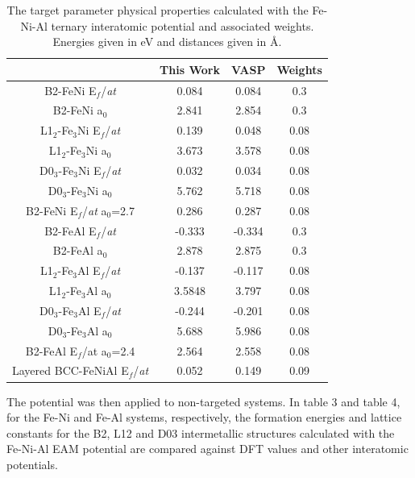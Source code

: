 \documentclass[review]{elsarticle}
\begin{document}
\begin{table}[htbp]
\caption{The target parameter physical properties calculated with the Fe-Ni-Al ternary interatomic potential and associated weights.  Energies given in eV and distances given in \AA{}.}
\begin{center}
\begin{tabular}{|c|c|c|c|}
	\hline
	& This Work & VASP & Weights \\
	 \hline
	 B2-FeNi E$_{f}$/\textit{at} & 0.084 & 0.084 & 0.3 \\
	 B2-FeNi a$_{0}$ & 2.841 & 2.854 & 0.3 \\
	 L1$_{2}$-Fe$_{3}$Ni E$_{f}$/\textit{at} & 0.139 & 0.048 & 0.08 \\
	 L1$_{2}$-Fe$_{3}$Ni a$_{0}$ & 3.673 & 3.578 & 0.08 \\
	 D0$_{3}$-Fe$_{3}$Ni E$_{f}$/\textit{at} & 0.032 & 0.034 & 0.08 \\
	 D0$_{3}$-Fe$_{3}$Ni a$_{0}$ & 5.762 & 5.718 & 0.08  \\
	 B2-FeNi E$_{f}$/\textit{at} a$_{0}$=2.7& 0.286 & 0.287 & 0.08 \\
	 B2-FeAl E$_{f}$/\textit{at} & -0.333 & -0.334 & 0.3  \\
	 B2-FeAl a$_{0}$ & 2.878 & 2.875 & 0.3 \\
	 L1$_{2}$-Fe$_{3}$Al E$_{f}$/\textit{at} & -0.137 & -0.117 & 0.08 \\
	 L1$_{2}$-Fe$_{3}$Al a$_{0}$ & 3.5848 & 3.797 & 0.08 \\
	 D0$_{3}$-Fe$_{3}$Al E$_{f}$/\textit{at} & -0.244 & -0.201 & 0.08 \\
	 D0$_{3}$-Fe$_{3}$Al a$_{0}$ & 5.688 & 5.986 & 0.08  \\
	 B2-FeAl E$_{f}$/at a$_{0}$=2.4 & 2.564 & 2.558 & 0.08  \\
	 Layered BCC-FeNiAl E$_{f}$/\textit{at}& 0.052 & 0.149 & 0.09 \\
	 \hline
\end{tabular}
\end{center}
\label{default}
\end{table}%

The potential was then applied to non-targeted systems.  In table 3 and table 4, for the Fe-Ni and Fe-Al systems, respectively, the formation energies and lattice constants for the B2, L12 and D03 intermetallic structures calculated with the Fe-Ni-Al EAM potential are compared against DFT values and other interatomic potentials.    
\end{document}

